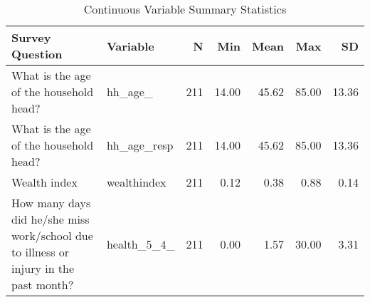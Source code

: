 \begin{table}[H]
\caption*{
{\large Continuous Variable Summary Statistics}
} 
\fontsize{12.0pt}{14.4pt}\selectfont
\begin{tabular*}{\linewidth}{@{\extracolsep{\fill}}llrrrrr}
\toprule
Survey Question & Variable & N & Min & Mean & Max & SD \\ 
\midrule\addlinespace[2.5pt]
What is the age of the household head? & hh\_age\_ & 211 & 14.00 & 45.62 & 85.00 & 13.36 \\ 
What is the age of the household head? & hh\_age\_resp & 211 & 14.00 & 45.62 & 85.00 & 13.36 \\ 
Wealth index & wealthindex & 211 & 0.12 & 0.38 & 0.88 & 0.14 \\ 
How many days did he/she miss work/school due to illness or injury in the past month? & health\_5\_4\_ & 211 & 0.00 & 1.57 & 30.00 & 3.31 \\ 
\bottomrule
\end{tabular*}
\end{table}


